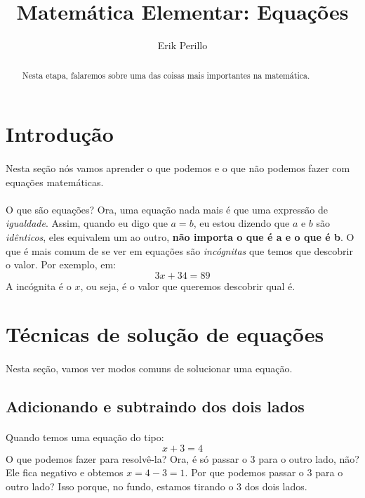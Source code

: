 \documentclass[11pt]{article}
\begin{document}
\title{Matemática Elementar: Equações}
\author{Erik Perillo}
\date{}
\maketitle
\begin{abstract}
Nesta etapa, falaremos sobre uma das coisas mais importantes na matemática.
\end{abstract}

\newpage

\tableofcontents

\newpage

\section{Introdução}
\paragraph{}
Nesta seção nós vamos aprender o que podemos e o que não podemos fazer com
equações matemáticas. 
\paragraph{}
O que são equações? Ora, uma equação nada mais é que uma expressão de
\emph{igualdade}. Assim, quando eu digo que $a = b$, eu estou dizendo que $a$
e $b$ são \emph{idênticos}, eles equivalem um ao outro, \textbf{não importa o
que é a e o que é b}. O que é mais comum de se ver em equações são
\emph{incógnitas} que temos que descobrir o valor. Por exemplo, em:
$$3x + 34 = 89$$
A incógnita é o $x$, ou seja, é o valor que queremos descobrir qual é. 

\section{Técnicas de solução de equações}
\paragraph{}
Nesta seção, vamos ver modos comuns de solucionar uma equação.

\subsection{Adicionando e subtraindo dos dois lados}
\paragraph{}
Quando temos uma equação do tipo:
$$x + 3 = 4$$
O que podemos fazer para resolvê-la? Ora, é só passar o $3$ para o outro lado,
não? Ele fica negativo e obtemos $x = 4 - 3 = 1$. Por que podemos passar o $3$
para o outro lado? Isso porque, no fundo, estamos tirando o $3$ dos dois lados.
\end{document}
